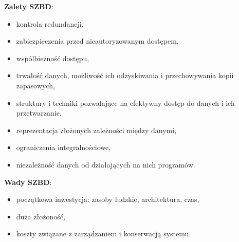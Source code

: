 \textbf{Zalety SZBD}:
\begin{itemize}
    \item kontrola redundancji,
    \item zabiezpieczenia przed nieautoryzowanym dostępem,
    \item wspólbieżność dostępu,
    \item trwałość danych, możliwość ich odzyskiwania i przechowywania kopii zapasowych,
    \item struktury i techniki pozwalające na efektywny dostęp do danych i ich przetwarzanie,
    \item reprezentacja złożonych zależności między danymi,
    \item ograniczenia integralnościowe,
    \item niezależność danych od działających na nich programów.
\end{itemize}

\textbf{Wady SZBD}:
\begin{itemize}
    \item początkowa inwestycja: zasoby ludzkie, architektura, czas,
    \item duża złożoność,
    \item koszty związane z zarządzaniem i konserwacją systemu.
\end{itemize}